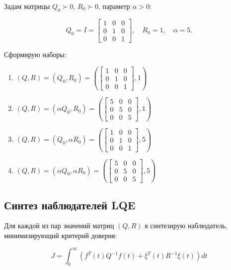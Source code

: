 \documentclass[a4paper,12pt]{article}
\begin{document}
Задам матрицы $Q_0 \succ 0$, $R_0 \succ 0$, параметр $\alpha > 0$:

\[
Q_0 = I = 
\begin{bmatrix}
	1 & 0 & 0 \\
	0 & 1 & 0 \\
	0 & 0 & 1
\end{bmatrix}, \quad
R_0 = 1, \quad
\alpha = 5.
\]

Сформирую наборы:

\begin{enumerate}
	\item $(Q, R) = (Q_0, R_0) = 
	\left(
	\begin{bmatrix}
		1 & 0 & 0 \\
		0 & 1 & 0 \\
		0 & 0 & 1
	\end{bmatrix}, 1
	\right)$
	
	\item $(Q, R) = (\alpha Q_0, R_0) = 
	\left(
	\begin{bmatrix}
		5 & 0 & 0 \\
		0 & 5 & 0 \\
		0 & 0 & 5
	\end{bmatrix}, 1
	\right)$
	
	\item $(Q, R) = (Q_0, \alpha R_0) = 
	\left(
	\begin{bmatrix}
		1 & 0 & 0 \\
		0 & 1 & 0 \\
		0 & 0 & 1
	\end{bmatrix}, 5
	\right)$
	
	\item $(Q, R) = (\alpha Q_0, \alpha R_0) = 
	\left(
	\begin{bmatrix}
		5 & 0 & 0 \\
		0 & 5 & 0 \\
		0 & 0 & 5
	\end{bmatrix}, 5
	\right)$
\end{enumerate}	
	
	
\subsection{Синтез наблюдателей LQE}

Для каждой из пар значений матриц $(Q, R)$ я синтезирую наблюдатель, минимизирующий критерий доверия:

\[
J = \int_{0}^{\infty} \left( f^T(t) Q^{-1} f(t) + \xi^T(t) R^{-1} \xi(t) \right) dt
\]
\end{document}

